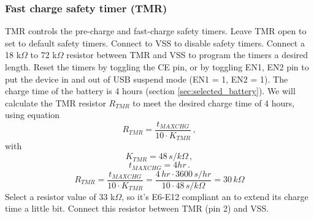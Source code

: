 \documentclass[11pt,a4paper]{article}
\begin{document}
\subsubsection{Fast charge safety timer (TMR)}
TMR controls the pre-charge and fast-charge safety timers. Leave TMR open to set to default safety timers. Connect to VSS to disable safety timers. Connect a 18 k$\Omega$ to 72 k$\Omega$ resistor between TMR and VSS to program the timers a desired length. Reset the timers by toggling the CE pin, or by toggling EN1, EN2 pin to put the device in and out of USB suspend mode (EN1 = 1, EN2 = 1). The charge time of the battery is 4 hours (section \ref{sec:selected_battery}). We will calculate the TMR resistor $R_{TMR}$ to meet the desired charge time of 4 hours, using equation \cite{bib:BQ24075}
\begin{equation}
R_{TMR} = \frac{t_{MAXCHG}}{10 \cdot K_{TMR}} \,,
\end{equation}
with 
\begin{equation}
K_{TMR} = 48 \, s/k\Omega \,,
\end{equation}
\begin{equation}
t_{MAXCHG} = 4 hr \,.
\end{equation}
\begin{equation}
R_{TMR} = \frac{t_{MAXCHG}}{10 \cdot K_{TMR}} = \frac{4 \, hr \cdot 3600 \, s/hr}{10 \cdot 48 \, s/k\Omega} = 30 \, k\Omega
\end{equation}
Select a resistor value of 33 k$\Omega$, so it's E6-E12 compliant an to extend its charge time a little bit. Connect this resistor between TMR (pin 2) and VSS.
\end{document}
